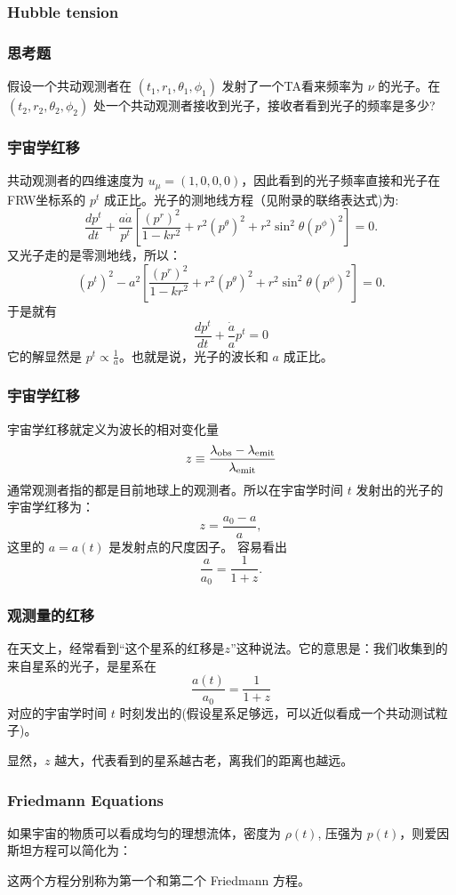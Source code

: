 \documentclass[CJK,13pt]{beamer}
\begin{document}
\begin{frame}
  \frametitle{Hubble tension}
\end{frame}

\begin{frame}
  \frametitle{思考题}
  
  假设一个共动观测者在 $(t_1, r_1, \theta_1,\phi_1)$ 发射了一个TA看来频率为 $\nu$ 的光子。在 $(t_2, r_2,\theta_2, \phi_2)$ 处一个共动观测者接收到光子，接收者看到光子的频率是多少?
\end{frame}


\begin{frame}
  \frametitle{宇宙学红移}
  共动观测者的四维速度为 $u_\mu = (1, 0, 0, 0)$，因此看到的光子频率直接和光子在FRW坐标系的 $p^t$ 成正比。光子的测地线方程（见附录的联络表达式)为:
  $$ \frac{dp^t}{dt} + \frac{a\dot a}{p^t} \left[\frac{(p^r)^2}{1-kr^2} + r^2\left(p^\theta\right)^2 + r^2\sin^2\theta \left(p^\phi\right)^2\right] = 0.$$
    又光子走的是零测地线，所以：
    $$\left(p^t\right)^2 - a^2\left[\frac{(p^r)^2}{1-kr^2} + r^2\left(p^\theta\right)^2 + r^2\sin^2\theta \left(p^\phi\right)^2 \right] = 0.$$
    于是就有
    $$\frac{d p^t}{dt}  + \frac{\dot a}{a } p^t = 0$$
    它的解显然是 $p^t \propto \frac{1}{a} $。也就是说，光子的波长和 $a$ 成正比。
\end{frame}


\begin{frame}
  \frametitle{宇宙学红移}
  宇宙学红移就定义为波长的相对变化量
  $$z \equiv \frac{\lambda_{\rm obs}-\lambda_{\rm emit}}{\lambda_{\rm emit}}$$
  通常观测者指的都是目前地球上的观测者。所以在宇宙学时间 $t$ 发射出的光子的宇宙学红移为：
  $$ z = \frac{a_0-a}{a}, $$
  这里的 $a=a(t)$ 是发射点的尺度因子。 容易看出
  $$  \frac{a}{a_0} = \frac{1}{1+z}.$$
\end{frame}


\begin{frame}
  \frametitle{观测量的红移}
  在天文上，经常看到“这个星系的红移是$z$”这种说法。它的意思是：我们收集到的来自星系的光子，是星系在
  $$ \frac{a(t)}{a_0} = \frac{1}{1+z}$$
  对应的宇宙学时间 $t$ 时刻发出的(假设星系足够远，可以近似看成一个共动测试粒子)。

  \skipline

  显然，$z$ 越大，代表看到的星系越古老，离我们的距离也越远。
\end{frame}


\begin{frame}
  \frametitle{Friedmann Equations}
  如果宇宙的物质可以看成均匀的理想流体，密度为 $\rho(t)$, 压强为 $p(t)$，则爱因斯坦方程可以简化为：

  这两个方程分别称为第一个和第二个 {\blue Friedmann 方程}。
  
\end{frame}
\end{document}
